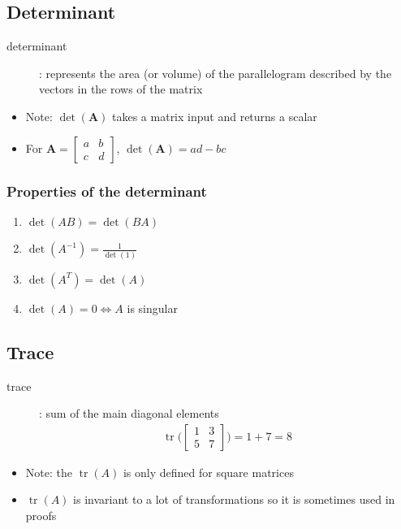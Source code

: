 \documentclass[letterpaper,12pt]{article}
\newcommand{\matr}[1]{\mathbf{#1}}
\DeclareMathOperator{\tr}{tr}
\begin{document}
\subsection{Determinant}
\begin{description}
 \item[determinant]: represents the area (or volume) of the parallelogram described by the vectors in the rows of the matrix
\end{description}
\begin{itemize}
 \item Note: $\det(\matr{A})$ takes a matrix input and returns a scalar
 \item For $\matr{A} = \begin{bmatrix}
         a & b \\
         c & d
        \end{bmatrix}$, $\det(\matr{A}) = ad - bc$
\end{itemize}

\subsubsection{Properties of the determinant}
\begin{enumerate}
 \item $\det(AB) = \det(BA)$
 \item $\det(A^{-1}) = \frac{1}{\det(1)}$
 \item $\det(A^T) = \det(A)$
 \item $\det(A) = 0 \iff A$ is singular
\end{enumerate}

\subsection{Trace}
\begin{description}
 \item[trace]: sum of the main diagonal elements
       \begin{align}
        \tr \bigg(\begin{bmatrix}
         1 & 3 \\
         5 & 7
        \end{bmatrix}\bigg) = 1 + 7 = 8
       \end{align}
\end{description}
\begin{itemize}
 \item Note: the $\tr(A)$ is only defined for square matrices
 \item $\tr(A)$ is invariant to a lot of transformations so it is sometimes used in proofs
\end{itemize}
\end{document}
